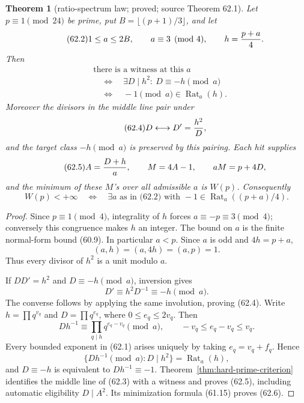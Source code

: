 \documentclass[10pt,reqno]{amsart}
\newtheorem{theorem}{Theorem}[section]
\theoremstyle{definition}
\newcommand{\1}{\mathbf 1}
\begin{document}
\begin{theorem}[ratio-spectrum law; proved; source Theorem 62.1]
\label{thm:ratio-spectrum}
Let $p\equiv1\pmod {24}$ be prime, put $B=\lfloor(p+1)/3\rfloor$, and let
\begin{equation}\tag{62.2}
       1\leq a\leq2B,\qquad a\equiv3\pmod4,
       \qquad h={p+a\over4}.
\end{equation}
Then
\begin{equation}\tag{62.3}
 \begin{split}
 &\text{there is a witness at this }a\\
 &\quad\Longleftrightarrow\quad
   \exists D\mid h^2:\ D\equiv-h\pmod a\\
 &\quad\Longleftrightarrow\quad
   -1\pmod a\in\operatorname {Rat}_a(h).
 \end{split}
\end{equation}
Moreover the divisors in the middle line pair under
\begin{equation}\tag{62.4}
                       D\longleftrightarrow D'={h^2\over D},
\end{equation}
and the target class $-h\pmod a$ is preserved by this pairing.  Each hit
supplies
\begin{equation}\tag{62.5}
 A={D+h\over a},\qquad M=4A-1,
 \qquad aM=p+4D,
\end{equation}
and the minimum of these $M$'s over all admissible $a$ is $W(p)$.
Consequently
\begin{equation}\tag{62.6}
 W(p)<+\infty\quad\Longleftrightarrow\quad
 \exists a\text{ as in (62.2) with }
 -1\in\operatorname {Rat}_a((p+a)/4).
\end{equation}
\end{theorem}
\begin{proof}
Since $p\equiv1\pmod4$, integrality of $h$ forces
$a\equiv-p\equiv3\pmod4$; conversely this congruence makes $h$ an integer.
The bound on $a$ is the finite normal-form bound (60.9).  In particular
$a<p$.  Since $a$ is odd and $4h=p+a$,
\[
             (a,h)=(a,4h)=(a,p)=1.
\]
Thus every divisor of $h^2$ is a unit modulo $a$.

If $DD'=h^2$ and $D\equiv-h\pmod a$, inversion gives
\[
 D'\equiv h^2D^{-1}\equiv-h\pmod a.
\]
The converse follows by applying the same involution, proving (62.4).
Write $h=\prod q^{v_q}$ and $D=\prod q^{e_q}$, where
$0\leq e_q\leq2v_q$.  Then
\begin{equation}\tag{62.7}
 Dh^{-1}\equiv\prod_{q\mid h}q^{e_q-v_q}\pmod a,
 \qquad -v_q\leq e_q-v_q\leq v_q.
\end{equation}
Every bounded exponent in (62.1) arises uniquely by taking
$e_q=v_q+f_q$.  Hence
\begin{equation}\tag{62.8}
 \{Dh^{-1}\pmod a:D\mid h^2\}=\operatorname {Rat}_a(h),
\end{equation}
and $D\equiv-h$ is equivalent to $Dh^{-1}\equiv-1$.
Theorem~\ref{thm:hard-prime-criterion} identifies the middle line of
(62.3) with a witness and proves (62.5), including automatic eligibility
$D\mid A^2$.  Its minimization formula (61.15) proves (62.6).
\end{proof}
\end{document}
